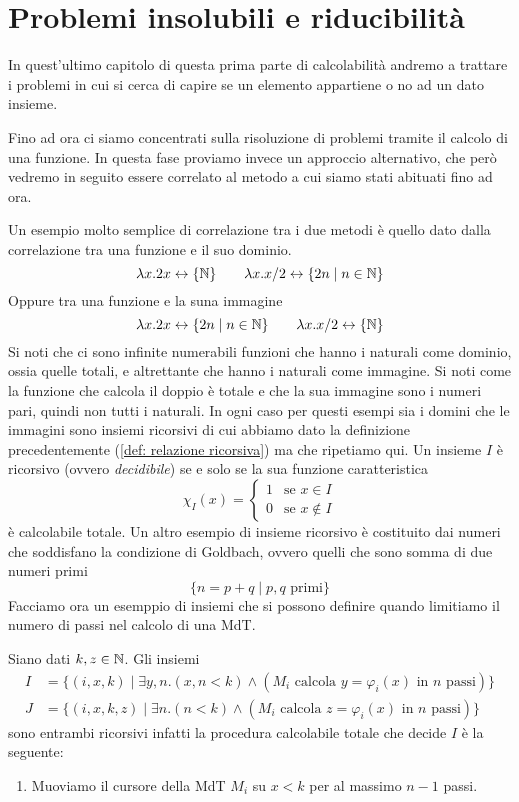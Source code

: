 \section{Problemi insolubili e riducibilità}
In quest'ultimo capitolo di questa prima parte di calcolabilità
andremo a trattare i problemi in cui si cerca di capire se un
elemento appartiene o no ad un dato insieme.

Fino ad ora ci siamo concentrati sulla risoluzione di problemi
tramite il calcolo di una funzione. In questa fase proviamo
invece un approccio alternativo, che però vedremo in seguito
essere correlato al metodo a cui siamo stati abituati fino ad
ora.

Un esempio molto semplice di correlazione tra i due metodi è
quello dato dalla correlazione tra una funzione e il suo dominio.
\[
	\lambda x . 2 x \leftrightarrow \{ \mathbb{N} \} \qquad
	\lambda x . x / 2 \leftrightarrow \{ 2n \mid n \in \mathbb{N} \}
\]
Oppure tra una funzione e la suna immagine
\[
	\lambda x . 2 x \leftrightarrow \{ 2 n \mid n \in \mathbb{N} \}
	\qquad \lambda x . x / 2 \leftrightarrow \{ \mathbb{N} \}
\]
Si noti che ci sono infinite numerabili funzioni che hanno i
naturali come dominio, ossia quelle totali, e altrettante che
hanno i naturali come immagine. Si noti come la funzione che
calcola il doppio è totale e che la sua immagine sono i numeri
pari, quindi non tutti i naturali. In ogni caso per questi
esempi sia i domini che le immagini sono insiemi ricorsivi
di cui abbiamo dato la definizione precedentemente
(\ref{def: relazione ricorsiva}) ma che ripetiamo qui. Un
insieme $I$ è ricorsivo (ovvero \emph{decidibile}) se e solo se
la sua funzione caratteristica
\[
	\chi_I (x) = \begin{cases}
		1 & \text{se } x \in I    \\
		0 & \text{se } x \notin I
	\end{cases}
\]
è calcolabile totale. Un altro esempio di insieme ricorsivo è
costituito dai numeri che soddisfano la condizione di Goldbach,
ovvero quelli che sono somma di due numeri primi
\[ \{ n = p + q \mid p, q \text{ primi} \} \]
Facciamo ora un esemppio di insiemi che si possono definire
quando limitiamo il numero di passi nel calcolo di una MdT.

\begin{example}
	Siano dati $k, z \in \mathbb{N}$. Gli insiemi
	\begin{align*}
		I & = \{ (i, x, k) \mid \exists y, n . (x,n < k)
		\land (M_i \text{ calcola } y = \varphi_i (x)
		\text{ in } n \text{ passi}) \}                  \\
		J & = \{ (i,x,k,z) \mid \exists n . (n < k)
		\land (M_i \text{ calcola } z = \varphi_i (x)
		\text{ in } n \text{ passi}) \}
	\end{align*}
	sono entrambi ricorsivi infatti la procedura calcolabile
	totale che decide $I$ è la seguente:
	\begin{enumerate}
		\item Muoviamo il cursore della MdT $M_i$ su $x < k$
		      per al massimo $n-1$ passi.
	\end{enumerate}
\end{example}
